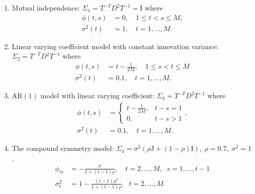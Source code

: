 \documentclass[12pt]{article}
\theoremstyle{definition}
\begin{document}
\begin{enumerate} 
\item Mutual independence: $\Sigma_1 = T^{-T} D^2 T^{-1} = \mathrm{I}$ where 
\begin{align*}
\phi\left(t,s\right) &= 0, \quad 1 \le t < s \le M;\\ 
\sigma^2\left(t\right) &= 1, \quad t = 1,\dots, M.
\end{align*}
\item Linear varying coefficient model with constant innovation variance: $\Sigma_2 = T^{-T} D^2 T^{-1}$ where 
\begin{align*}
\phi\left(t,s\right) &= t - \frac{1}{2M}, \quad 1 \le s < t \le M \\
\sigma^2\left(t\right) &= 0.1, \quad t = 1,\dots, M.
\end{align*}
\item $\mbox{AR}\left(1\right)$ model with linear varying coefficient: $\Sigma_3 = T^{-T} D^2 T^{-1}$ where 
\begin{align*}
\phi\left(t,s\right) &= \left\{\begin{array}{ll} t - \frac{1}{2M}, & t - s = 1\\ 0, & t - s > 1\end{array}\right.,\\
\sigma^2\left(t\right) &= 0.1, \quad t = 1,\dots, M.
\end{align*}
\item The compound symmetry model: $\Sigma_4 = \sigma^2\left(\rho \mathrm{J} + \left(1-\rho\right)\mathrm{I}\right),\; \rho=0.7,\;\sigma^2=1$. 
\begin{align*}
\phi_{ts} &= -\frac{\rho}{1 + \left(t-1\right)\rho}, \quad t = 2, \dots, M,\;\; s = 1, \dots, t-1\\
\sigma_t^2 &= 1 -\frac{\left(t-1\right)\rho^2}{1 + \left(t-1\right)\rho}, \;\; t = 2, \dots, M.
\end{align*}
\end{enumerate}
\end{document}

